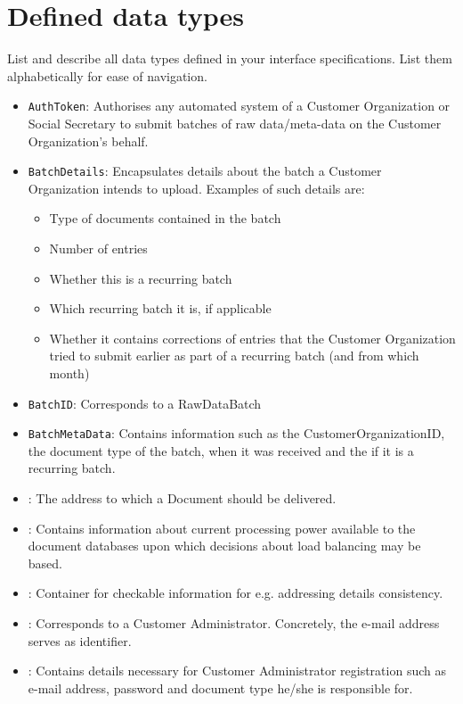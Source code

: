 \section{Defined data types}\label{app:datatypes}
List and describe all data types defined in your interface specifications. List
them alphabetically for ease of navigation.

\begin{itemize}
	\item \texttt{AuthToken}: Authorises any automated system of a Customer Organization or Social Secretary to submit batches of raw data/meta-data on the Customer Organization's behalf.
	\item \texttt{BatchDetails}: Encapsulates details about the batch a Customer Organization intends to upload. Examples of such details are:
	\begin{itemize}
		\item Type of documents contained in the batch
		\item Number of entries
		\item Whether this is a recurring batch
		\item Which recurring batch it is, if applicable
		\item Whether it contains corrections of entries that the Customer Organization tried to submit earlier as part of a recurring batch (and from which month)
	\end{itemize}
	\item \texttt{BatchID}: Corresponds to a RawDataBatch
	\item \texttt{BatchMetaData}: Contains information such as the CustomerOrganizationID, the document type of the batch, when it was received and the  if it is a recurring batch.
	\item {}: The address to which a Document should be delivered.
	\item {}: Contains information about current processing power available to the document databases upon which decisions about load balancing may be based.
	\item {}: Container for checkable information for e.g. addressing details consistency.
	\item {}: Corresponds to a Customer Administrator. Concretely, the e-mail address serves as identifier.
	\item {}: Contains details necessary for Customer Administrator registration such as e-mail address, password and document type he/she is responsible for.

\end{itemize}
